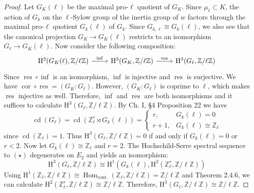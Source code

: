 \begin{proof}
Let $G_K(\ell)$ be the maximal pro-$\ell$ quotient of $G_K$. Since $\mu_\ell\subset K$, the action of $G_k$ on the $\ell$-Sylow group of the inertia group of $w$ factors through the maximal pro-$\ell$ quotient $G_k(\ell)$ of $G_k$. Since $G_{k,\ell}\cong G_k(\ell)$, we also see that the canonical projection $G_K\to G_K(\ell)$ restricts to an isomorphism $G_\ell\to G_K(\ell)$. Now consider the following composition:
\[ \begin{tikzcd}
\mathrm{H}^3(G_K(\ell),\mathbb{Z}/\ell\mathbb{Z}) \ar[r, "\operatorname{inf}"] & \mathrm{H}^3(G_K,\mathbb{Z}/\ell\mathbb{Z}) \ar[r, "\operatorname{res}"] & \mathrm{H}^3(G_\ell,\mathbb{Z}/\ell\mathbb{Z})
\end{tikzcd} \]
Since $\operatorname{res}\circ\operatorname{inf}$ is an isomorphism, $\operatorname{inf}$ is injective and $\operatorname{res}$ is surjective. We have $\operatorname{cor}\circ\operatorname{res} = (G_K:G_\ell)$. However, $(G_K:G_\ell)$ is coprime to $\ell$, which makes $\operatorname{res}$ injective as well. Therefore, $\operatorname{inf}$ and $\operatorname{res}$ are both isomorphisms and it suffices to calculate $\mathrm{H}^3(G_\ell,\mathbb{Z}/\ell\mathbb{Z})$. By \cite{Se64} Ch. I, §4 Proposition 22 we have
\[\operatorname{cd}(G_\ell) = \operatorname{cd}(\mathbb{Z}_\ell^r\rtimes G_k(\ell)) = \begin{cases}
r, & G_k(\ell) = 0 \\
r + 1, & G_k(\ell)\cong\mathbb{Z}_\ell
\end{cases} \] 
since $\operatorname{cd}(\mathbb{Z}_\ell)=1$. Thus $\mathrm{H}^3(G_\ell, \mathbb{Z}/\ell\mathbb{Z}) =0$ if and only if $G_k(\ell) = 0$ or $r < 2$. Now let $G_k(\ell) \cong\mathbb{Z}_\ell$ and $r = 2$. The Hochschild-Serre spectral sequence to $(\star)$ degenerates on $E_2$ and yields an isomorphism:
\[ \mathrm{H}^3(G_\ell,\mathbb{Z}/\ell\mathbb{Z}) \cong \mathrm{H}^1(G_k(\ell), \mathrm{H}^2 (\mathbb{Z}_\ell^r, \mathbb{Z}/\ell\mathbb{Z})) \]
Using $\mathrm{H}^1(\mathbb{Z}_\ell, \mathbb{Z}/\ell\mathbb{Z})\cong\operatorname{Hom}_\text{cont.}(\mathbb{Z}_\ell, \mathbb{Z}/\ell\mathbb{Z})=\mathbb{Z}/\ell\mathbb{Z}$ and \cite{NSW} Theorem 2.4.6, we can calculate $\mathrm{H}^2(\mathbb{Z}_\ell^r,\mathbb{Z}/\ell\mathbb{Z}) \cong\mathbb{Z}/\ell\mathbb{Z}$. Therefore, $\mathrm{H}^3(G_\ell,\mathbb{Z}/\ell\mathbb{Z})\cong\mathbb{Z}/\ell\mathbb{Z}$.


\end{proof}

